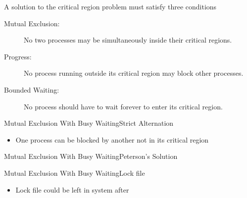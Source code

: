 \begin{frame}
  \begin{block}{A solution to the critical region problem must satisfy three conditions}
    \begin{description}
    \item[Mutual Exclusion:] No two processes may be simultaneously inside their critical
      regions.
    \item[Progress:] No process running outside its critical region may block other
      processes.
    \item[Bounded Waiting:] No process should have to wait forever to enter its critical
      region.
    \end{description}
  \end{block}
\end{frame}

\begin{frame}{Mutual Exclusion With Busy Waiting}{Strict Alternation}
  \begin{center}
  \end{center}
  \begin{itemize}
  \item[\Bad] One process can be blocked by another not in its critical region
  \end{itemize}
\end{frame}

\begin{frame}{Mutual Exclusion With Busy Waiting}{Peterson's Solution}
  \begin{center}
  \end{center}
  \begin{refsection}
    \nocite{wiki:peterson}
    \printbibliography[heading=none]
  \end{refsection}
\end{frame}

\begin{frame}{Mutual Exclusion With Busy Waiting}{Lock file}
  \begin{itemize}
  \item[\Bad] Lock file could be left in system after \Cc
  \end{itemize}
\end{frame}

